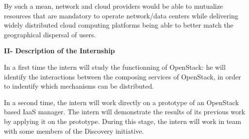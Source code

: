 \documentclass{letter}
\begin{document}
\begin{letter}
By such a mean, network and cloud providers would be able to mutualize resources
that are mandatory to operate network/data centers while delivering widely 
distributed cloud computing platforms being able to better match the 
geographical dispersal of users.

{\Large \textbf{II- Description of the Internship}}

In a first time the intern will study the functionning of OpenStack: he will
identify the interactions between the composing services of OpenStack, in
order to indentify which mechanisms can be distributed.

In a second time, the intern will work directly on a prototype of an OpenStack 
based IaaS manager. The intern will demonstrate the results of its previous work
by applying it on the prototype. During this stage, the intern will work in team
with some members of the Discovery initiative.

\end{letter}
\end{document}
